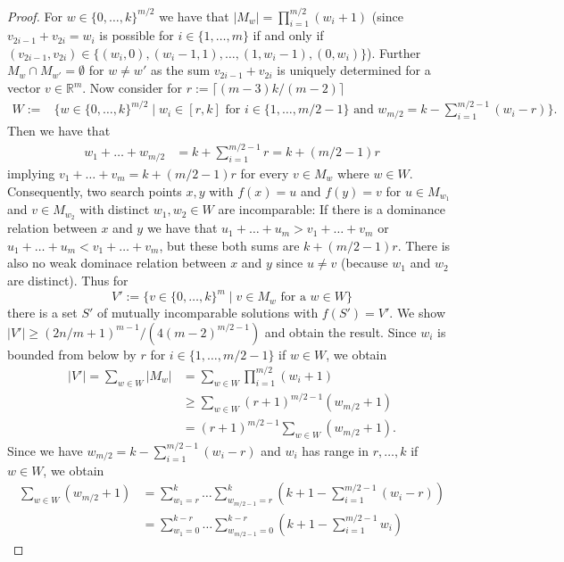\documentclass[
sigconf = false, %
review = false, %
screen = true, %
anonymous = true, %
format=acmsmall
]{acmart}
\begin{document}
\begin{proof}
For $w \in \{0, \ldots, k\}^{m/2}$ we have that $\lvert{M_w}\rvert = \prod_{i=1}^{m/2} (w_i+1)$ (since $v_{2i-1}+v_{2i}=w_i$ is possible for $i \in \{1, \ldots , m\}$ if and only if $(v_{2i-1},v_{2i}) \in \{(w_i,0), (w_i-1,1), \ldots, (1,w_i-1),(0,w_i)\}$). 
Further $M_w \cap M_{w'} = \emptyset$ for $w \neq w'$ as the sum $v_{2i-1}+v_{2i}$ is uniquely determined for a vector $v \in \mathbb{R}^m$. Now consider for $r:=\lceil{(m-3)k/(m-2)}\rceil$
\begin{align*}
W:=&\Big\{w \in \{0, \ldots , k\}^{m/2} \mid w_i \in [r,k] \text{ for } i \in \{1,\ldots ,m/2-1\} \text{ and } w_{m/2}=k - \sum_{i=1}^{m/2-1} (w_i-r) \Big\}.
\end{align*}
Then we have that
\begin{align*}
w_1 + \ldots + w_{m/2} &= k+\sum_{i=1}^{m/2-1} r = k+(m/2-1)r
\end{align*}
implying $v_1+ \ldots + v_m = k+(m/2-1)r$ for every $v \in M_w$ where $w \in W$. 
Consequently, two search points $x,y$ with $f(x)=u$ and $f(y)=v$ for $u \in M_{w_1}$ and $v \in M_{w_2}$ with distinct $w_1,w_2 \in W$ are incomparable: 
If there is a dominance relation between $x$ and $y$ we have that $u_1+ \ldots + u_m > v_1 + \ldots + v_m$ or $u_1+ \ldots + u_m < v_1+ \ldots + v_m$, but these both sums are $k+(m/2-1)r$. There is also no weak dominace relation between $x$ and $y$ since $u \neq v$ (because $w_1$ and $w_2$ are distinct). Thus for
\[
V':=\{v \in \{0, \ldots, k\}^m \mid v \in M_w \text{ for a } w \in W\}
\]
there is a set $S'$ of mutually incomparable solutions with $f(S')=V'$. We show $\vert{V'}\vert\geq (2n/m+1)^{m-1}/(4(m-2)^{m/2-1})$ and obtain the result. Since $w_i$ is bounded from below by $r$ for $i \in \{1, \ldots , m/2-1\}$ if $w \in W$, we obtain
\begin{align*}
\lvert{V'}\rvert = \sum_{w \in W} \lvert{M_w}\rvert &= \sum_{w \in W}\prod_{i=1}^{m/2} (w_i+1)\\
&\geq \sum_{w \in W}(r+1)^{m/2-1}(w_{m/2}+1) \\
    &= (r+1)^{m/2-1}\sum_{w \in W}(w_{m/2}+1).
     \end{align*}
     Since we have $w_{m/2}=k-\sum_{i=1}^{m/2-1}(w_i-r)$ and $w_i$ has range in $r, \ldots ,k$ if $w \in W$, we obtain
    \begin{align*}
     \sum_{w \in W}(w_{m/2}+1) &= \sum_{w_1=r}^{k} \ldots \sum_{w_{m/2-1}=r}^{k} \left(k+1-\sum_{i=1}^{m/2-1} (w_i-r) \right)\\
    &= \sum_{w_1=0}^{k-r} \ldots \sum_{w_{m/2-1}=0}^{k-r} \left(k+1-\sum_{i=1}^{m/2-1} w_i \right)

\end{align*}
\end{proof}
\end{document}
